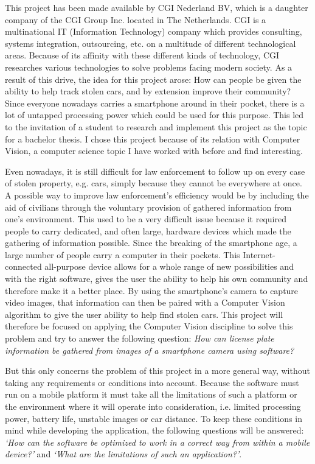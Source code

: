 
This project has been made available by CGI Nederland BV, which is a daughter company of the CGI Group Inc. located in The Netherlands. CGI is a multinational IT (Information Technology) company which provides consulting, systems integration, outsourcing, etc. on a multitude of different technological areas. Because of its affinity with these different kinds of technology, CGI researches various technologies to solve problems facing modern society. As a result of this drive, the idea for this project arose: How can people be given the ability to help track stolen cars, and by extension improve their community? Since everyone nowadays carries a smartphone around in their pocket, there is a lot of untapped processing power which could be used for this purpose. This led to the invitation of a student to research and implement this project as the topic for a bachelor thesis. I chose this project because of its relation with Computer Vision, a computer science topic I have worked with before and find interesting.


Even nowadays, it is still difficult for law enforcement to follow up on every case of stolen property, e.g. cars, simply because they cannot be everywhere at once. A possible way to improve law enforcement's efficiency would be by including the aid of civilians through the voluntary provision of gathered information from one's environment. This used to be a very difficult issue because it required people to carry dedicated, and often large, hardware devices which made the gathering of information possible. Since the breaking of the smartphone age, a large number of people carry a computer in their pockets. This Internet-connected all-purpose device allows for a whole range of new possibilities and with the right software, gives the user the ability to help his own community and therefore make it a better place. By using the smartphone's camera to capture video images, that information can then be paired with a Computer Vision algorithm to give the user ability to help find stolen cars. This project will therefore be focused on applying the Computer Vision discipline to solve this problem and try to answer the following question: \textit{How can license plate information be gathered from images of a smartphone camera using software?}

But this only concerns the problem of this project in a more general way, without taking any requirements or conditions into account. Because the software must run on a mobile platform it must take all the limitations of such a platform or the environment where it will operate into consideration, i.e. limited processing power, battery life, unstable images or car distance. To keep these conditions in mind while developing the application, the following questions will be answered: \textit{`How can the software be optimized to work in a correct way from within a mobile device?'} and \textit{`What are the limitations of such an application?'}.

